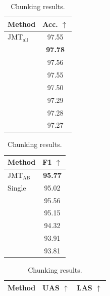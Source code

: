 \documentclass[11pt,a4paper]{article}
\begin{document}
\begin{table}[t!]
\begin{minipage}[t]{.32\textwidth}
  \begin{center}
{\scriptsize
	\begin{tabular}{l|c}
    Method   & Acc. $\uparrow$ \\ \hline
	JMT$_{\mathrm{all}}$ &  97.55  \\ \hline
	\citet{ling2015charlstm} &  {\bf 97.78}  \\
	\citet{kumar2016dmn} &        97.56 \\
    \citet{ma2016seqlabel} & 97.55 \\
    \citet{sogaard2011pos} & 97.50 \\
    \citet{collobert2011senna} & 97.29 \\
    \citet{tsuruoka2011} & 97.28 \\
    \citet{toutanova2003pos} & 97.27 \\ \hline
  \end{tabular}
}
    \caption{POS tagging results.}
    \label{table:pos}
  \end{center}
\end{minipage}
%
%
\begin{minipage}[t]{.32\textwidth}
  \begin{center}
{\scriptsize
	\begin{tabular}{l|c}
    Method   & F1 $\uparrow$ \\ \hline
	JMT$_{\mathrm{AB}}$ &  {\bf 95.77}  \\
   	Single				 &  95.02  \\ \hline
	\citet{sogaard2016} &  95.56  \\
	\citet{suzuki2008chunk} & 95.15 \\
    \citet{collobert2011senna} & 94.32 \\
    \citet{kudo2001chunk} & 93.91 \\
    \citet{tsuruoka2011} & 93.81 \\ \hline
  \end{tabular}
}
    \caption{Chunking results.}
    \label{table:chunk}
  \end{center}
\end{minipage}
%
%
\begin{minipage}[t]{.35\textwidth}
  \begin{center}
{\scriptsize
	\begin{tabular}{l|cc}
    Method   & UAS $\uparrow$ & LAS $\uparrow$ \\ \hline

\end{tabular}}
\end{center}
\end{minipage}
\end{table}
\end{document}
